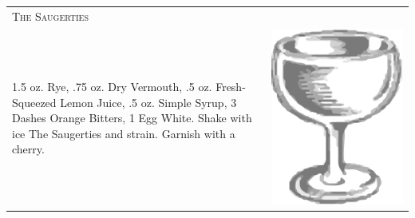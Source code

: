 \documentclass{article}
\begin{document}
\begin{multicols}{2}
\begin{tabular}{p{2in} p{0.5in}}
\multicolumn{2}{p{3in}}{\centering\Huge\textsc{The Saugerties}} \\ 
  \vspace{-0.1in}1.5 oz. Rye, .75 oz. Dry Vermouth, .5 oz. Fresh-Squeezed Lemon Juice, .5 oz. Simple Syrup, 3 Dashes Orange Bitters, 1 Egg White. Shake with ice The Saugerties and strain. Garnish with a cherry. &
  \vspace{-0.1in} \includegraphics{coupe.png}
\end{tabular}


\end{multicols}
\end{document}
